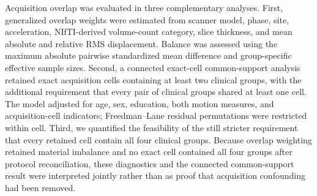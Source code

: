 \documentclass{article}
\providecommand{\DIFchgtex}[1]{{\setlength{\fboxsep}{0pt}\colorbox{yellow}{\strut #1}}}
\providecommand{\DIFchg}[1]{\texorpdfstring{\DIFchgtex{#1}\allowbreak}{#1}}
\providecommand{\DIFchgbegin}{}
\begin{document}
\begingroup
\color{blue}
\def\DIFchg#1{#1}
\DIFchgbegin \DIFchg{Acquisition} \DIFchg{overlap} \DIFchg{was} \DIFchg{evaluated} \DIFchg{in} \DIFchg{three} \DIFchg{complementary} \DIFchg{analyses.} \DIFchg{First,} \DIFchg{generalized} \DIFchg{overlap} \DIFchg{weights} \DIFchg{were} \DIFchg{estimated} \DIFchg{from} \DIFchg{scanner} \DIFchg{model,} \DIFchg{phase,} \DIFchg{site,} \DIFchg{acceleration,} \DIFchg{NIfTI-derived} \DIFchg{volume-count} \DIFchg{category,} \DIFchg{slice} \DIFchg{thickness,} \DIFchg{and} \DIFchg{mean} \DIFchg{absolute} \DIFchg{and} \DIFchg{relative} \DIFchg{RMS} \DIFchg{displacement.} \DIFchg{Balance} \DIFchg{was} \DIFchg{assessed} \DIFchg{using} \DIFchg{the} \DIFchg{maximum} \DIFchg{absolute} \DIFchg{pairwise} \DIFchg{standardized} \DIFchg{mean} \DIFchg{difference} \DIFchg{and} \DIFchg{group-specific} \DIFchg{effective} \DIFchg{sample} \DIFchg{sizes.} \DIFchg{Second,} \DIFchg{a} \DIFchg{connected} \DIFchg{exact-cell} \DIFchg{common-support} \DIFchg{analysis} \DIFchg{retained} \DIFchg{exact} \DIFchg{acquisition} \DIFchg{cells} \DIFchg{containing} \DIFchg{at} \DIFchg{least} \DIFchg{two} \DIFchg{clinical} \DIFchg{groups,} \DIFchg{with} \DIFchg{the} \DIFchg{additional} \DIFchg{requirement} \DIFchg{that} \DIFchg{every} \DIFchg{pair} \DIFchg{of} \DIFchg{clinical} \DIFchg{groups} \DIFchg{shared} \DIFchg{at} \DIFchg{least} \DIFchg{one} \DIFchg{cell.} \DIFchg{The} \DIFchg{model} \DIFchg{adjusted} \DIFchg{for} \DIFchg{age,} \DIFchg{sex,} \DIFchg{education,} \DIFchg{both} \DIFchg{motion} \DIFchg{measures,} \DIFchg{and} \DIFchg{acquisition-cell} \DIFchg{indicators;} \DIFchg{Freedman--Lane} \DIFchg{residual} \DIFchg{permutations} \DIFchg{were} \DIFchg{restricted} \DIFchg{within} \DIFchg{cell.} \DIFchg{Third,} \DIFchg{we} \DIFchg{quantified} \DIFchg{the} \DIFchg{feasibility} \DIFchg{of} \DIFchg{the} \DIFchg{still} \DIFchg{stricter} \DIFchg{requirement} \DIFchg{that} \DIFchg{every} \DIFchg{retained} \DIFchg{cell} \DIFchg{contain} \DIFchg{all} \DIFchg{four} \DIFchg{clinical} \DIFchg{groups.} \DIFchg{Because} \DIFchg{overlap} \DIFchg{weighting} \DIFchg{retained} \DIFchg{material} \DIFchg{imbalance} \DIFchg{and} \DIFchg{no} \DIFchg{exact} \DIFchg{cell} \DIFchg{contained} \DIFchg{all} \DIFchg{four} \DIFchg{groups} \DIFchg{after} \DIFchg{protocol} \DIFchg{reconciliation,} \DIFchg{these} \DIFchg{diagnostics} \DIFchg{and} \DIFchg{the} \DIFchg{connected} \DIFchg{common-support} \DIFchg{result} \DIFchg{were} \DIFchg{interpreted} \DIFchg{jointly} \DIFchg{rather} \DIFchg{than} \DIFchg{as} \DIFchg{proof} \DIFchg{that} \DIFchg{acquisition} \DIFchg{confounding} \DIFchg{had} \DIFchg{been} \DIFchg{removed.}
\endgroup
\end{document}

